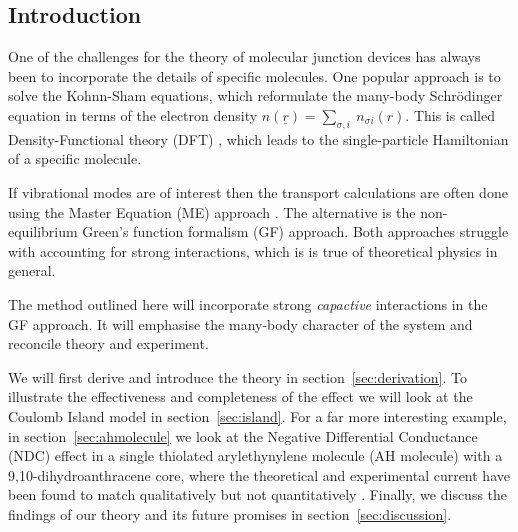 \documentclass{article}
\begin{document}
\begin{multicols}{2}
    
    \section{Introduction}
        One of the challenges for the theory of molecular junction devices has always been to incorporate the details of specific molecules. One popular approach is to solve the Kohnn-Sham equations\cite{kohnsham}, which reformulate the many-body Schr\"odinger equation in terms of the electron density $n(\underline{r})=\sum_{\sigma,i}\:n_{\sigma i}(r)$. This is called Density-Functional theory (DFT) \cite{nobel1998}, which leads to the single-particle Hamiltonian of a specific molecule.  
        
        If vibrational modes are of interest then the transport calculations are often done using the Master Equation (ME) approach \cite{beenakker}. The alternative is the non-equilibrium Green's function formalism (GF) approach. Both approaches struggle with accounting for strong interactions, which is is true of theoretical physics in general. 
        
        The method outlined here will incorporate strong \emph{capactive} interactions in the GF approach. It will emphasise the many-body character of the system and reconcile theory and experiment.
        
        We will first derive and introduce the theory in section~\ref{sec:derivation}. To illustrate the effectiveness and completeness of the effect we will look at the Coulomb Island model in section~\ref{sec:island}. For a far more interesting example, in section~\ref{sec:ahmolecule} we look at the Negative Differential Conductance (NDC) effect in a single thiolated arylethynylene molecule (AH molecule) with a 9,10-dihydroanthracene core, where the theoretical and experimental current have been found to match qualitatively but not quantitatively \cite{perrinnano}. Finally, we discuss the findings of our theory and its future promises in section~\ref{sec:discussion}.
    

\end{multicols}
\end{document}
